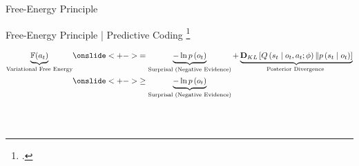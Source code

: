 \documentclass[t,aspectratio=169,xcolor=dvipsnames]{beamer}
\newcommand\blfootcitetext[1]{%
  \begingroup
  \renewcommand\thefootnote{}\footcitetext{#1}%
  \addtocounter{footnote}{-1}%
  \endgroup
}
\begin{document}
{\begin{frame}{Free-Energy Principle}

\end{frame}

\begin{frame}{Free-Energy Principle | Predictive Coding}
    \blfootcitetext{friston2010free}
    \begin{align*}
        \underbrace{\mathbb{F}(a_t)}_{\text{Variational Free Energy}} &
        \onslide<+->{=\underbrace{-\ln p\left(o_t\right)}_{\text {Surprisal (Negative Evidence)}}+\underbrace{\mathbf{D}_{K L}\left[Q\left(s_t \mid o_t, a_t; \phi\right) \| p\left(s_t \mid o_t\right)\right]}_{\text {Posterior Divergence }}}\\ &
        \onslide<+->{\geq \underbrace{-\ln p\left(o_t\right)}_{\text {Surprisal (Negative Evidence)}}}\\
        \phantom{\underbrace{\mathbb{F}(a_t)}_{\text{Variational Free Energy}}} &
        \phantom{=\mathbf{D}_{K L}\left[Q\left(s_t \mid o_t ; \phi\right) \| p\left(o_t, s_t\right)\right]
        =\mathbb{E}_{Q\left(s_t \mid o_t ; \phi\right)}\left[\ln \frac{Q\left(s_t \mid o_t ; \phi\right)}{p\left(o_t, s_t\right)}\right]}
    \end{align*}


\end{frame}}
\end{document}

